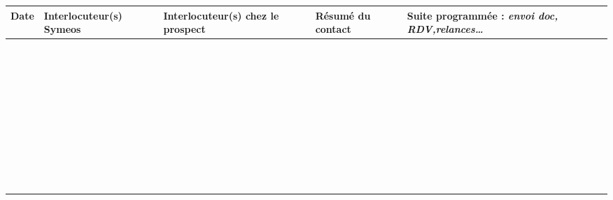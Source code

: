 \documentclass[a4paper, oneside, 12pt, french]{article}
\begin{document}
\small
\begin{tabular}{|c|p{3cm}|p{3cm}|p{5cm}|p{3cm}|}
\hline
Date & Interlocuteur(s) Symeos & Interlocuteur(s) chez le prospect& Résumé du contact & Suite programmée : \textit{envoi doc, RDV,relances\dots}\\
\hline
\hline
& & & & \\
& & & & \\
& & & & \\
\hline
& & & & \\
& & & & \\
& & & & \\
\hline
& & & & \\
& & & & \\
& & & & \\
\hline
& & & & \\
& & & & \\
& & & & \\
\hline
& & & & \\
& & & & \\
& & & & \\
\hline
& & & & \\
& & & & \\
& & & & \\
\hline
& & & & \\
& & & & \\
& & & & \\
\hline
& & & & \\
& & & & \\
& & & & \\
\hline
& & & & \\
& & & & \\
& & & & \\
\hline
& & & & \\
& & & & \\
& & & & \\
\hline
& & & & \\
& & & & \\
& & & & \\
\hline
& & & & \\
& & & & \\
& & & & \\
\hline
& & & & \\
& & & & \\
& & & & \\
\hline
& & & & \\
& & & & \\
& & & & \\
\hline
\end{tabular}
\end{document}
